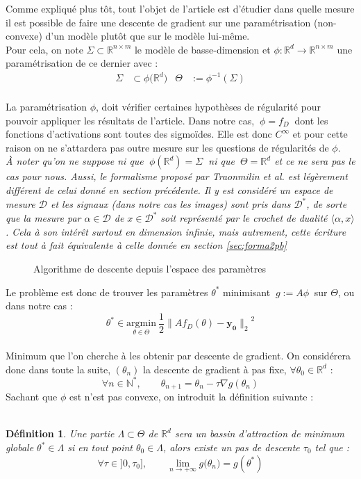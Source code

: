 \documentclass[hidelinks, french]{article} %
\newcommand{\N}{\mathbb{N}}
\newcommand{\R}{\mathbb{R}}
\newcommand{\lr}{\longrightarrow}
\newcommand{\etal}{\textit{et al. }}
\newcommand{\argmin}[1]{\underset{#1}{\text{argmin}}}
\renewcommand{\bf}[1]{\boldsymbol{#1}}
\theoremstyle{enonce}
\newtheorem{definition}{Définition}
\theoremstyle{special}
\theoremstyle{rq}
\theoremstyle{exo}
\theoremstyle{demo}
\begin{document}
Comme expliqué plus tôt, tout l'objet de l'article \cite{traonmilin_basins_2022} est d'étudier dans quelle mesure il est possible de faire une descente de gradient sur une paramétrisation (non-convexe) d'un modèle plutôt que sur le modèle lui-même. 
\\
Pour cela, on note $\Sigma\subset\R^{n\times m}$ le modèle de basse-dimension et $\phi: \R^d\lr\R^{n\times m}$ une paramétrisation de ce dernier avec :
\begin{align*}\Sigma&\subset\phi\big(\R^d\big)  &  \Theta&:=\phi^{-1}(\Sigma)\end{align*}
\\
La paramétrisation $\phi$, doit vérifier certaines hypothèses de régularité pour pouvoir appliquer les résultats de l'article. Dans notre cas, $\ \phi=f_D\ $ dont les fonctions d'activations sont toutes des sigmoïdes. Elle est donc $C^{\infty}$ et pour cette raison on ne s'attardera pas outre mesure sur les questions de régularités de $\phi$.
\\

\textit{\`A noter qu'on ne suppose ni que $\ \phi(\R^d)=\Sigma\ $ ni que  $\ \Theta=\R^d$ et ce ne sera pas le cas pour nous. Aussi, le formalisme proposé par Traonmilin \etal est légèrement différent de celui donné en section précédente. Il y est considéré un espace de mesure $\mathcal{D}$ et les signaux (dans notre cas les images) sont pris dans $\mathcal{D}^*$, de sorte que la mesure par $\alpha\in\mathcal{D}$ de $x\in\mathcal{D}^*$ soit représenté par le crochet de dualité $\langle \alpha,x\rangle$. Cela à son intérêt surtout en dimension infinie, mais autrement, cette écriture est tout à fait équivalente à celle donnée en section \ref{sec:forma2pb}}
\\

\begin{figure}
    
    \caption{Algorithme de descente depuis l'espace des paramètres}
    \label{fig:pcode LGD}
\end{figure}

Le problème est donc de trouver les paramètres $\theta^*$ minimisant $\ g:=A\phi\ $ sur $\Theta$, ou dans notre cas :
\[\theta^*\in\argmin{\theta\in\Theta}\ \frac{1}{2}{\big\|Af_D(\theta)-\bf{y_0}\big\|_2}^2\]
\\
Minimum que l'on cherche à les obtenir par descente de gradient. On considérera donc dans toute la suite, $(\theta_n)$ la descente de gradient à pas fixe, $\forall\theta_0\in\R^d$ :
\[\forall n\in\N^*,\qquad \theta_{n+1} = \theta_n - \tau\nabla g(\theta_n)\]
Sachant que $\phi$ est n'est pas convexe, on introduit la définition suivante :
\\ \\
\begin{definition} 
Une partie $\Lambda\subset\Theta$ de $\R^d$ sera un \emph{bassin d'attraction} de minimum globale $\theta^*\in\Lambda$ si en tout point $\theta_0\in\Lambda$, alors existe un pas de descente $\tau_0$ tel que :
\[\forall \tau\in]0,\tau_0],\qquad \lim_{n\lr+\infty}g\big(\theta_n\big)=g(\theta^*)\]
\end{definition}
\end{document}
